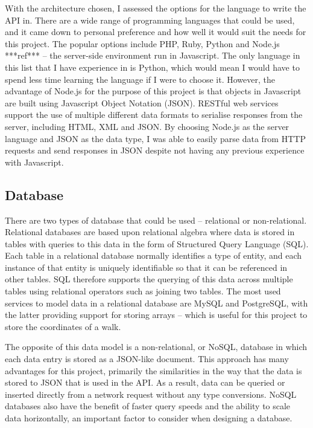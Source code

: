 With the architecture chosen, I assessed the options for the language to write the API in. There are a wide range of programming languages that could be used, and it came down to personal preference and how well it would suit the needs for this project. The popular options include PHP, Ruby, Python and Node.js ***ref*** -- the server-side environment run in Javascript. The only language in this list that I have experience in is Python, which would mean I would have to spend less time learning the language if I were to choose it. However, the advantage of Node.js for the purpose of this project is that objects in Javascript are built using Javascript Object Notation (JSON). RESTful web services support the use of multiple different data formats to serialise responses from the server, including HTML, XML and JSON. By choosing Node.js as the server language and JSON as the data type, I was able to easily parse data from HTTP requests and send responses in JSON despite not having any previous experience with Javascript.

\subsection{Database}

There are two types of database that could be used -- relational or non-relational. Relational databases are based upon relational algebra where data is stored in tables with queries to this data in the form of Structured Query Language (SQL). Each table in a relational database normally identifies a type of entity, and each instance of that entity is uniquely identifiable so that it can be referenced in other tables. SQL therefore supports the querying of this data across multiple tables using relational operators such as joining two tables. The most used services to model data in a relational database are MySQL and PostgreSQL, with the latter providing support for storing arrays -- which is useful for this project to store the coordinates of a walk.

The opposite of this data model is a non-relational, or NoSQL, database in which each data entry is stored as a JSON-like document. This approach has many advantages for this project, primarily the similarities in the way that the data is stored to JSON that is used in the API. As a result, data can be queried or inserted directly from a network request without any type conversions. NoSQL databases also have the benefit of faster query speeds and the ability to scale data horizontally, an important factor to consider when designing a database.

